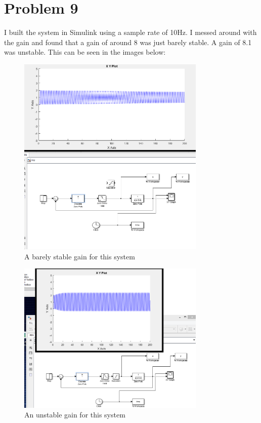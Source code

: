\documentclass{article}
\begin{document}
\section*{Problem 9}
I built the system in Simulink using a sample rate of 10Hz. I messed around with the gain and found that a gain of around 8 was just barely stable. A gain of 8.1 was unstable. This can be seen in the images below:
\begin{figure}[H]
    \centering
    \includegraphics[width=0.8\textwidth]{stable.png}
    \caption{A barely stable gain for this system}
\end{figure}
\begin{figure}[H]
    \centering
    \includegraphics[width=0.8\textwidth]{unstable.png}
    \caption{An unstable gain for this system}
\end{figure}
\end{document}
